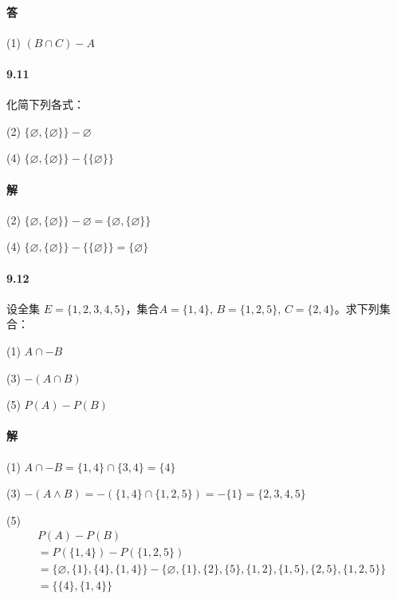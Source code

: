\documentclass[UTF8]{ctexart}
\begin{document}
\paragraph{答} (1) $(B \cap C)-A$

\paragraph{9.11}\label{9.11}
化简下列各式：

(2) $ \{ \varnothing, \{ \varnothing \} \} - \varnothing $

(4) $ \{ \varnothing, \{ \varnothing \} \} - \{ \{ \varnothing \} \} $

\paragraph{解}
(2) $ \{ \varnothing, \{ \varnothing \} \} - \varnothing = \{ \varnothing, \{ \varnothing \} \} $

(4) $ \{ \varnothing, \{ \varnothing \} \} - \{ \{ \varnothing \} \} = \{ \varnothing \} $

\paragraph{9.12}\label{9.12}
设全集 $E=\{1,2,3,4,5\}$，集合$A = \{ 1,4 \} $, $B= \{ 1,2,5 \}$, $C= \{ 2,4 \}$。求下列集合：

(1) $A \cap -B$

(3) $ -(A \cap B)$

(5) $P(A) - P(B)$

\paragraph{解}
(1) $ A \cap -B = \{ 1,4 \} \cap \{ 3,4 \} = \{ 4 \} $

(3) $ -(A \land B) = - ( \{ 1,4 \} \cap \{ 1,2,5 \} ) = - \{ 1 \} = \{ 2,3,4,5 \} $

(5) 
\begin{align*}
    & P(A) - P(B) \\
    & = P( \{ 1,4 \} ) - P( \{ 1,2,5 \} ) \\
    & = \{ \varnothing, \{ 1 \} , \{ 4 \} , \{ 1,4 \} \} - \{ \varnothing, \{ 1 \} , \{ 2 \} , \{ 5 \} , \{ 1,2 \} , \{ 1,5 \} , \{ 2,5 \} , \{ 1,2,5 \} \} \\
    & = \{ \{ 4 \} , \{ 1,4 \} \} 
\end{align*}
\end{document}
